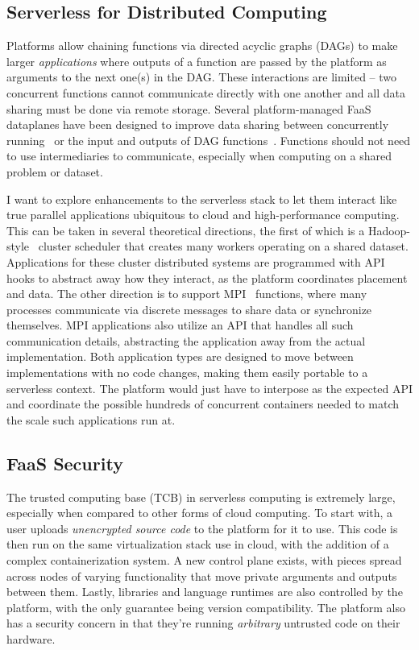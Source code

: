 \subsection{Serverless for Distributed Computing}
\label{sec:new-mpi}

Platforms allow chaining functions via directed acyclic graphs (DAGs) to make larger \emph{applications} where outputs of a function are passed by the platform as arguments to the next one(s) in the DAG.
These interactions are limited -- two concurrent functions cannot communicate directly with one another and all data sharing must be done via remote storage.
Several platform-managed FaaS dataplanes have been designed to improve data sharing between concurrently running~\cite{giantsidi2023flexlog,sreekanti2020fault} or the input and outputs of DAG functions~\cite{mvondo2021ofc,romero2021faa,abdi2023palette}.
Functions should not need to use intermediaries to communicate, especially when computing on a shared problem or dataset.

I want to explore enhancements to the serverless stack to let them interact like true parallel applications ubiquitous to cloud and high-performance computing.
This can be taken in several theoretical directions, the first of which is a Hadoop-style~\cite{hadoop} cluster scheduler that creates many workers operating on a shared dataset.
Applications for these cluster distributed systems are programmed with API hooks to abstract away how they interact, as the platform coordinates placement and data.
The other direction is to support MPI~\cite{mpi} functions, where many processes communicate via discrete messages to share data or synchronize themselves.
MPI applications also utilize an API that handles all such communication details, abstracting the application away from the actual implementation.
Both application types are designed to move between implementations with no code changes, making them easily portable to a serverless context.
The platform would just have to interpose as the expected API and coordinate the possible hundreds of concurrent containers needed to match the scale such applications run at.

\subsection{FaaS Security}

The trusted computing base (TCB) in serverless computing is extremely large, especially when compared to other forms of cloud computing.
To start with, a user uploads \emph{unencrypted source code} to the platform for it to use.
This code is then run on the same virtualization stack use in cloud, with the addition of a complex containerization system.
A new control plane exists, with pieces spread across nodes of varying functionality that move private arguments and outputs between them.
Lastly, libraries and language runtimes are also controlled by the platform, with the only guarantee being version compatibility. 
The platform also has a security concern in that they're running \emph{arbitrary} untrusted code on their hardware.


